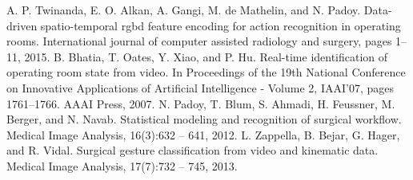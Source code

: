 \documentclass[a4paper, 10pt, conference]{ieeeconf}      %
\begin{document}
\begin{thebibliography}{99}


A. P. Twinanda, E. O. Alkan, A. Gangi, M. de Mathelin, and N.
Padoy. Data-driven spatio-temporal rgbd feature encoding for action recognition in operating rooms. International journal of computer assisted radiology and surgery, pages 1–11, 2015.
B. Bhatia, T. Oates, Y. Xiao, and P. Hu. Real-time identification of operating room state from video. In Proceedings of the 19th National Conference
on Innovative Applications of Artificial Intelligence - Volume 2, IAAI’07, pages 1761–1766. AAAI Press, 2007. 
N. Padoy, T. Blum, S. Ahmadi, H. Feussner, M. Berger, and N. Navab. Statistical modeling and recognition of surgical workflow. Medical Image Analysis, 16(3):632 – 641, 2012.
L. Zappella, B. Bejar, G. Hager, and R. Vidal. Surgical gesture classification from video and kinematic data. Medical Image Analysis, 17(7):732 – 745, 2013.


\end{thebibliography}
\end{document}
